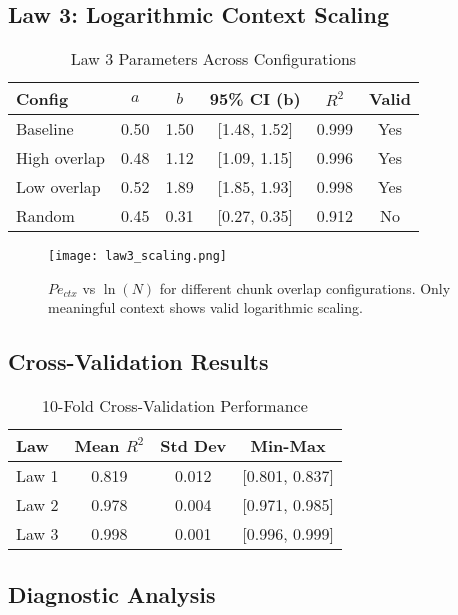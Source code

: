 \documentclass[conference]{IEEEtran}
\begin{document}
\subsection{Law 3: Logarithmic Context Scaling}

\begin{table}[h]
\centering
\caption{Law 3 Parameters Across Configurations}
\label{tab:law3_results}
\begin{tabular}{@{}lccccc@{}}
\toprule
Config & $a$ & $b$ & 95\% CI (b) & $R^2$ & Valid \\
\midrule
Baseline & 0.50 & 1.50 & [1.48, 1.52] & 0.999 & Yes \\
High overlap & 0.48 & 1.12 & [1.09, 1.15] & 0.996 & Yes \\
Low overlap & 0.52 & 1.89 & [1.85, 1.93] & 0.998 & Yes \\
Random & 0.45 & 0.31 & [0.27, 0.35] & 0.912 & No \\
\bottomrule
\end{tabular}
\end{table}

\begin{figure}[h]
\centering
\texttt{[image: law3\_scaling.png]}
\caption{$Pe_{ctx}$ vs $\ln(N)$ for different chunk overlap configurations. Only meaningful context shows valid logarithmic scaling.}
\label{fig:law3}
\end{figure}

\subsection{Cross-Validation Results}

\begin{table}[h]
\centering
\caption{10-Fold Cross-Validation Performance}
\label{tab:cross_validation}
\begin{tabular}{@{}lccc@{}}
\toprule
Law & Mean $R^2$ & Std Dev & Min-Max \\
\midrule
Law 1 & 0.819 & 0.012 & [0.801, 0.837] \\
Law 2 & 0.978 & 0.004 & [0.971, 0.985] \\
Law 3 & 0.998 & 0.001 & [0.996, 0.999] \\
\bottomrule
\end{tabular}
\end{table}

\subsection{Diagnostic Analysis}
\end{document}
